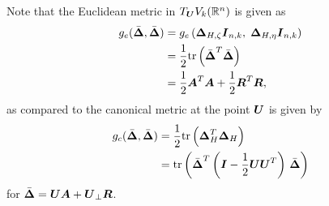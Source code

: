 \documentclass[11pt]{article}
\begin{document}
Note that the Euclidean metric in $ T_{\boldsymbol{U}}V_{k}({\mathbb R}^{n})$ is given as 
\begin{align*}
g_{e}(\bar{\boldsymbol{\Delta}},  \bar{\boldsymbol{\Delta}}) &= g_{e}\left(\boldsymbol{\Delta}_{H,\zeta}\boldsymbol{I}_{n,k}, \;\boldsymbol{\Delta}_{H,\eta}\boldsymbol{I}_{n,k}\right)\\
&= \frac{1}{2}\mathrm{tr}\left(\bar{\boldsymbol{\Delta}}^{T}\bar{\boldsymbol{\Delta}} \right)\\
&= \frac{1}{2}\boldsymbol{A}^{T}\boldsymbol{A} + \frac{1}{2}\boldsymbol{R}^{T}\boldsymbol{R},
\end{align*}
as compared to the canonical metric at the point $\boldsymbol{U}$ is given by
\begin{align}
g_{c}(\bar{\boldsymbol{\Delta}},  \bar{\boldsymbol{\Delta}}) &= \frac{1}{2}\mathrm{tr}\left(\boldsymbol{\Delta}_{H}^{T}\boldsymbol{\Delta}_{H}  \right) \nonumber\\
&=\mathrm{tr}\left( \bar{\boldsymbol{\Delta}}^{T} \left( \boldsymbol{I} - \frac{1}{2}\boldsymbol{U}\boldsymbol{U}^{T} \right)\,  \bar{\boldsymbol{\Delta}}  \right) \label{eqn: can_metric_Stiefel_mat}
\end{align}
for $\bar{\boldsymbol{\Delta}} = \boldsymbol{U}\boldsymbol{A} + \boldsymbol{U}_{\bot}\boldsymbol{R}$.

 
\end{document}
